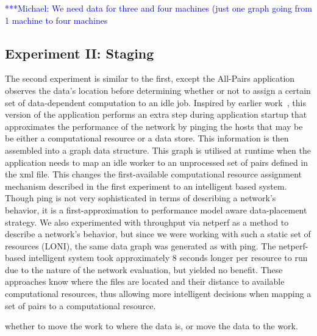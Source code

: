 \documentclass{rspublic}
\newcommand{\micnote}[1]{ {\textcolor{blue} { ***Michael: #1 }}}
\newcommand{\betynote}[1]{ {\textcolor{orange} { ***Bety: #1 }}}
\newcommand{\jhanote}[1]{} \newcommand{\micnote}[1]{}\newcommand{\betynote}[1]{} \newcommand{\fixme}[1]{}
\begin{document}
\jhanote{We need data for compute (comparison) and I/O (only) for
different data-set sizes} \micnote{We need data for three and four
machines (just one graph going from 1 machine to four machines}

\subsection{Experiment II: Staging}
The second experiment is similar to the first, except the All-Pairs
application observes the data's location before determining whether or
not to assign a certain set of data-dependent computation to an idle
job. Inspired by earlier work~\citep{netperf}, this version of the
application performs an extra step during application startup that
approximates the performance of the network by pinging the hosts that
may be be either a computational resource or a data store. This
information is then assembled into a graph data structure.  This graph
is utilised at runtime when the application needs to map an idle worker
to an unprocessed set of pairs defined in the xml file. This changes the
first-available computational resource assignment mechanism described in
the first experiment to an intelligent based system. Though ping is not
very sophisticated in terms of describing a network's behavior, it is a
first-approximation to performance model aware data-placement strategy.
We also experimented with throughput via netperf  as a method to describe a network's behavior, but since we were
working with such a static set of resources (LONI), the same data graph
was generated as with ping. The netperf-based intelligent system took
approximately 8 seconds longer per resource to run due to the nature of
the network evaluation, but yielded no benefit. These approaches know
where the files are located and their distance to available
computational resources, thus allowing more intelligent decisions when
mapping a set of pairs to a computational resource.

whether to move the work
to where the data is, or move the data to the work. \jhanote{Data-aware
placement is also required, i.e., managing location of files.} 
\end{document}
